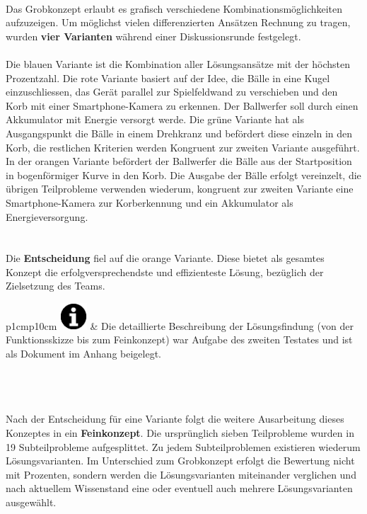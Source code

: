 \\
Das Grobkonzept erlaubt es grafisch verschiedene Kombinationsmöglichkeiten aufzuzeigen. Um möglichst vielen differenzierten Ansätzen Rechnung zu tragen, wurden \textbf{vier Varianten} während einer Diskussionsrunde festgelegt.\\
\\
Die blauen Variante ist die Kombination aller Lösungsansätze mit der höchsten Prozentzahl. Die rote Variante basiert auf der Idee, die Bälle in eine Kugel einzuschliessen, das Gerät parallel zur Spielfeldwand zu verschieben und den Korb mit einer Smartphone-Kamera zu erkennen. Der Ballwerfer soll durch einen Akkumulator mit Energie versorgt werde. Die grüne Variante hat als Ausgangspunkt die Bälle in einem Drehkranz und befördert diese einzeln in den Korb, die restlichen Kriterien werden Kongruent zur zweiten Variante ausgeführt. In der orangen Variante befördert der Ballwerfer die Bälle aus der Startposition in bogenförmiger Kurve in den Korb. Die Ausgabe der Bälle erfolgt vereinzelt, die übrigen Teilprobleme verwenden wiederum, kongruent zur zweiten Variante eine Smartphone-Kamera zur Korberkennung und ein Akkumulator als Energieversorgung.\\
\\\\
Die \textbf{Entscheidung} fiel auf die orange Variante. Diese bietet als gesamtes Konzept die erfolgversprechendste und effizienteste Lösung, bezüglich der Zielsetzung des Teams. \\

\begin{tabular}{p{1cm}p{10cm}}
		{\includegraphics[width=1cm]{Enddokumentation/Varianten/Bilder/info_icon.png}}
	 & Die detaillierte Beschreibung der Lösungsfindung (von der Funktionsskizze bis zum Feinkonzept) war Aufgabe des zweiten Testates und ist als Dokument im Anhang beigelegt. \\
\end{tabular}\\
\\
\\
Nach der Entscheidung für eine Variante folgt die weitere Ausarbeitung dieses Konzeptes
in ein \textbf{Feinkonzept}. Die ursprünglich sieben Teilprobleme wurden in 19 Subteilprobleme
aufgesplittet. Zu jedem Subteilproblemen existieren wiederum Lösungsvarianten. Im Unterschied zum Grobkonzept erfolgt die Bewertung nicht mit Prozenten, sondern werden die Lösungsvarianten miteinander verglichen und nach aktuellem Wissenstand eine oder eventuell auch mehrere Lösungsvarianten ausgewählt. 


